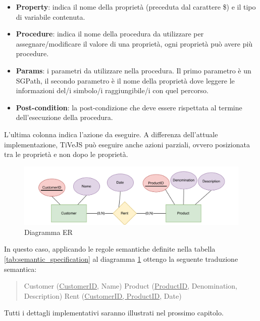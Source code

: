         \begin{itemize}
            \item \textbf{Property}: indica il nome della proprietà (preceduta dal carattere \$) e il tipo di variabile contenuta.
            \item \textbf{Procedure}: indica il nome della procedura da utilizzare per assegnare/modificare il valore di una proprietà, ogni proprietà può avere più procedure.
            \item \textbf{Params}: i parametri da utilizzare nella procedura. Il primo parametro è un SGPath, il secondo parametro è il nome della proprietà dove leggere le informazioni del/i simbolo/i raggiungibile/i con quel percorso.
            \item \textbf{Post-condition}: la post-condizione che deve essere rispettata al termine dell'esecuzione della procedura. 
        \end{itemize}
        L'ultima colonna indica l'azione da eseguire. A differenza dell'attuale implementazione, TiVeJS può eseguire anche azioni parziali, ovvero posizionata tra le proprietà e non dopo le proprietà.
        \newline
        \begin{figure}[htbp]
            \centering
            \includegraphics[scale=0.4]{Figure/er_diagram.PNG}
            \caption{Diagramma ER}
            \label{fig:er_diagram}
        \end{figure}
        In questo caso, applicando le regole semantiche definite nella tabella \ref{tab:semantic_specification} al diagramma \ref{fig:er_diagram} ottengo la seguente traduzione semantica:
        \begin{quotation}
            \noindent
            Customer (\underline{CustomerID}, Name) \newline
            Product (\underline{ProductID}, Denomination, Description) \newline
            Rent (\underline{CustomerID, ProductID}, Date)
        \end{quotation}
        Tutti i dettagli implementativi saranno illustrati nel prossimo capitolo.